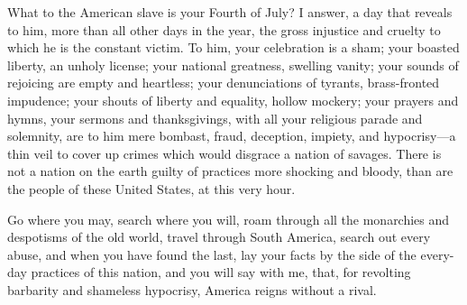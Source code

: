 What to the American slave is your Fourth of July? I answer, a day
that reveals to him, more than all other days in the year, the gross
injustice and cruelty to which he is the constant victim. To him, your
celebration is a sham; your boasted liberty, an unholy license; your
national greatness, swelling vanity; your sounds of rejoicing are
empty and heartless; your denunciations of tyrants, brass-fronted
impudence; your shouts of liberty and equality, hollow mockery; your
prayers and hymns, your sermons and thanksgivings, with all your
religious parade and solemnity, are to him mere bombast, fraud,
deception, impiety, and hy\-poc\-ri\-sy---a thin veil to cover up
crimes which would disgrace a nation of savages. There is not a nation
on the earth guilty of practices more shocking and bloody, than are
the people of these United States, at this very hour.

Go where you may, search where you will, roam through all the
monarchies and despotisms of the old world, travel through South
America, search out every abuse, and when you have found the last, lay
your facts by the side of the every-day practices of this nation, and
you will say with me, that, for revolting barbarity and shameless
hypocrisy, America reigns without a rival.

